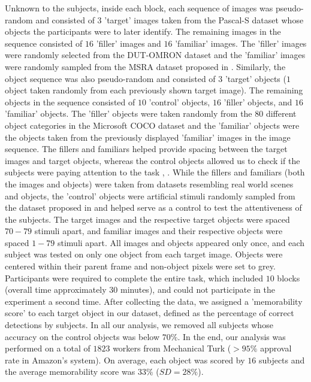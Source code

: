 Unknown to the subjects, inside each block, each sequence of images was pseudo-random and consisted of $3$ 'target' images taken from the Pascal-S dataset whose objects the participants were to later identify. The remaining images in the sequence consisted of $16$ 'filler' images and $16$ 'familiar' images. The 'filler' images were randomly selected from the DUT-OMRON dataset \cite{dutomron13} and the 'familiar' images were randomly sampled from the MSRA dataset proposed in \cite{msra11}. Similarly, the object sequence was also pseudo-random and consisted of $3$ 'target' objects ($1$ object taken randomly from each previously shown target image). The remaining objects in the sequence consisted of $10$ 'control' objects, $16$ 'filler' objects, and $16$ 'familiar' objects. The 'filler' objects were taken randomly from the $80$ different object categories in the Microsoft COCO dataset \cite{coco14} and the 'familiar' objects were the objects taken from the previously displayed 'familiar' images in the image sequence. The fillers and familiars helped provide spacing between the target images and target objects, whereas the control objects allowed us to check if the subjects were paying attention to the task \cite{brady08}, \cite{isola11}. While the fillers and familiars (both the images and objects) were taken from datasets resembling real world scenes and objects, the 'control' objects were artificial stimuli randomly sampled from the dataset proposed in \cite{brady08} and helped serve as a control to test the attentiveness of the subjects. The target images and the respective target objects were spaced $70-79$ stimuli apart, and familiar images and their respective objects were spaced $1-79$ stimuli apart. All images and objects appeared only once, and each subject was tested on only one object from each target image. Objects were centered within their parent frame and non-object pixels were set to grey. Participants were required to complete the entire task, which included $10$ blocks (overall time approximately $30$ minutes), and could not participate in the experiment a second time. After collecting the data, we assigned a 'memorability score' to each target object in our dataset, defined as the percentage of correct detections by subjects. In all our analysis, we removed all subjects whose accuracy on the control objects was below $70\%$. In the end, our analysis was performed on a total of {$1823$} workers from Mechanical Turk ($> 95\%$ approval rate in Amazon’s system). On average, each object was scored by $16$ subjects and the average memorability score was $33\%$ ($SD = 28\%$).